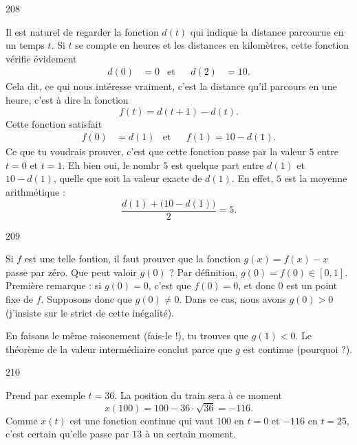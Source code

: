 \documentclass{article}
\begin{document}
\begin{corrige}{208}

Il est naturel de regarder la fonction $d(t)$ qui indique la distance parcourue en un temps $t$. Si $t$ se compte en heures et les distances en kilomètres, cette fonction vérifie évidement
\begin{align*}
d(0)&=0&\text{et}&&d(2)&=10.
\end{align*}
Cela dit, ce qui nous intéresse vraiment, c'est la distance qu'il parcours en une heure, c'est à dire la fonction
\[ 
  f(t)=d(t+1)-d(t).
\]
Cette fonction satisfait 
\begin{align*}
f(0)&=d(1)&\text{et}&&f(1)=10-d(1).
\end{align*}
Ce que tu voudrais prouver, c'est que cette fonction passe par la valeur $5$ entre $t=0$ et $t=1$. Eh bien oui, le nombr $5$ est quelque part entre $d(1)$ et $10-d(1)$, quelle que soit la valeur exacte de $d(1)$. En effet, $5$ est la moyenne arithmétique :
\[ 
  \frac{ d(1)+\big(10-d(1)\big) }{ 2 }=5.
\]

\end{corrige}




\begin{corrige}{209}

Si $f$ est une telle fontion, il faut prouver que la fonction $g(x)=f(x)-x$ passe par zéro. Que peut valoir $g(0)$ ? Par définition, $g(0)=f(0)\in[0,1]$. Première remarque : si $g(0)=0$, c'est que $f(0)=0$, et donc $0$ est un point fixe de $f$. Supposons donc que $g(0)\neq 0$. Dans ce cas, nous avons $g(0)>0$ (j'insiste sur le strict de cette inégalité).

En faisans le même raisonement (fais-le !), tu trouves que $g(1)<0$. Le théorème de la valeur intermédiaire conclut parce que $g$ est continue (pourquoi ?).

\end{corrige}


\begin{corrige}{210}

Prend par exemple $t=36$. La position du train sera à ce moment 
\[ 
  x(100)=100-36\cdot\sqrt{36}=-116.
\]
Comme $x(t)$ est une fonction continue qui vaut $100$ en $t=0$ et $-116$ en $t=25$, c'est certain qu'elle passe par $13$ à un certain moment.

\end{corrige}
\end{document}
